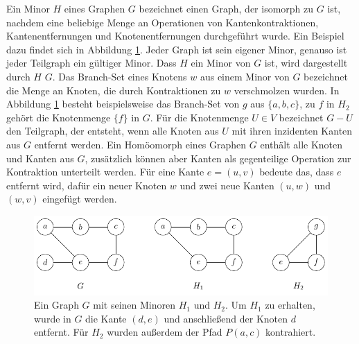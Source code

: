 Ein Minor $H$ eines Graphen $G$ bezeichnet einen Graph, der isomorph zu $G$ ist, nachdem eine beliebige Menge an Operationen von Kantenkontraktionen, Kantenentfernungen und Knotenentfernungen durchgeführt wurde.
Ein Beispiel dazu findet sich in Abbildung \ref{fig:Minor}.
Jeder Graph ist sein eigener Minor, genauso ist jeder Teilgraph ein gültiger Minor.
Dass $H$ ein Minor von $G$ ist, wird dargestellt durch $H$ \minor $G$.
Das Branch-Set eines Knotens $w$ aus einem Minor von $G$ bezeichnet die Menge an Knoten, die durch Kontraktionen zu $w$ verschmolzen wurden.
In Abbildung \ref{fig:Minor} besteht beispielsweise das Branch-Set von $g$ aus $\{a, b, c\}$, zu $f$ in $H_2$ gehört die Knotenmenge $\{f\}$ in $G$.
Für die Knotenmenge $U \in V$ bezeichnet $G - U$ den Teilgraph, der entsteht, wenn alle Knoten aus $U$ mit ihren inzidenten Kanten aus $G$ entfernt werden.
Ein Homöomorph eines Graphen $G$ enthält alle Knoten und Kanten aus $G$, zusätzlich können aber Kanten als gegenteilige Operation zur Kontraktion unterteilt werden.
Für eine Kante $e = (u, v)$ bedeute das, dass $e$ entfernt wird, dafür ein neuer Knoten $w$ und zwei neue Kanten $(u, w)$ und $(w, v)$ eingefügt werden.
\begin{figure}[H]
  \centering
  \includegraphics[keepaspectratio]{bilder/Minor.pdf}
  \caption{Ein Graph $G$ mit seinen Minoren $H_1$ und $H_2$.
           Um $H_1$ zu erhalten, wurde in $G$ die Kante $(d, e)$ und anschließend der Knoten $d$ entfernt.
           Für $H_2$ wurden außerdem der Pfad $P(a, c)$ kontrahiert.}
  \label{fig:Minor}
\end{figure}

